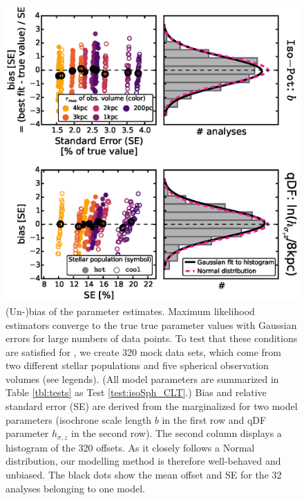 \begin{figure}[!htbp]
\centering
\includegraphics[width=\columnwidth]{figs/isoSph_CLT_2.eps}
\caption{(Un-)bias of the parameter estimates. Maximum likelihood estimators converge to the true true parameter values with Gaussian errors for large numbers of data points. To test that these conditions are satisfied for \RM{}, we create 320 mock data sets, which come from two different stellar populations and five spherical observation volumes (see legends). (All model parameters are summarized in Table \ref{tbl:tests} as Test \ref{test:isoSph_CLT}.) Bias and relative standard error (SE) are derived from the marginalized \pdf{} for two model parameters (isochrone scale length $b$ in the first row and qDF parameter $h_{\sigma,z}$ in the second row). The second column displays a histogram of the 320 offsets. As it closely follows a Normal distribution, our modelling method is therefore well-behaved and unbiased. The black dots show the mean offset and SE for the 32 analyses belonging to one model.}
\label{fig:isoSph_CLT}
\end{figure}



